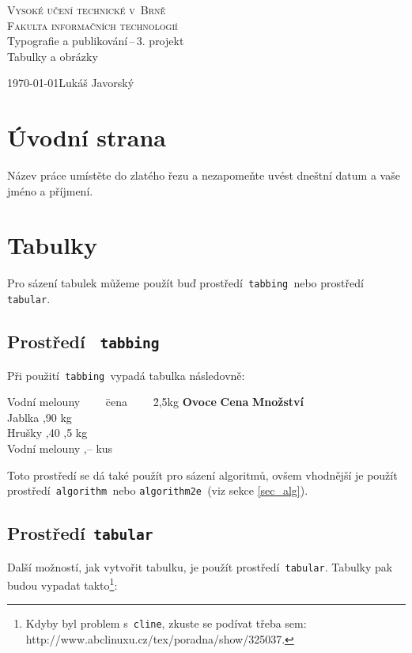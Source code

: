 \documentclass[a4paper, 11pt]{article}
\begin{document}
\begin{titlepage}
	\begin{center}
	\Huge\textsc{Vysoké učení technické v~Brně}\\
	\huge\textsc{Fakulta informačních technologií}\\
	\LARGE Typografie a publikování\,--\,3. projekt\\
	\Huge Tabulky a obrázky\\
	\end{center}
	{\Large \today \hfill Lukáš Javorský}
\end{titlepage}
	
\section{Úvodní strana}
Název práce umístěte do zlatého řezu a nezapomeňte uvést dneštní datum a vaše jméno a příjmení.
	
\section{Tabulky}
Pro sázení tabulek můžeme použít buď prostředí\verb| tabbing |nebo prostředí\verb| tabular|.

\subsection {Prostředí \texttt{ tabbing}}
Při použití\verb| tabbing |vypadá tabulka následovně:

\begin{tabbing}
	Vodní melouny ~~~~\= cena ~~~~\= 2,5kg \kill
	\textbf{Ovoce} \> \textbf{Cena} \> \textbf{Množství}\\
	Jablka ,90  kg\\
	Hrušky ,40 ,5 kg\\
	Vodní melouny ,--  kus\\
\end{tabbing}

\noindent Toto prostředí se dá také použít pro sázení algoritmů, ovšem vhodnější je použít 
prostředí\verb| algorithm |nebo \verb|algorithm2e |(viz sekce \ref{sec_alg}).

\subsection {Prostředí\texttt{ tabular}}
Další možností, jak vytvořit tabulku, je použít prostředí\verb| tabular|. Tabulky pak 
budou vypadat takto\footnote{Kdyby byl problem s\texttt{ cline}, zkuste se podívat třeba sem: 
http://www.abclinuxu.cz/tex/poradna/show/325037.}:
\end{document}
